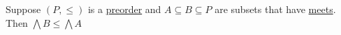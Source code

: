 
Suppose $(P,\leq)$ is a \hyperref[D1.30]{preorder} and $A \subseteq B \subseteq P$ are subsets that have \hyperref[D1.81]{meets}. Then $\bigwedge B \leq \bigwedge A$